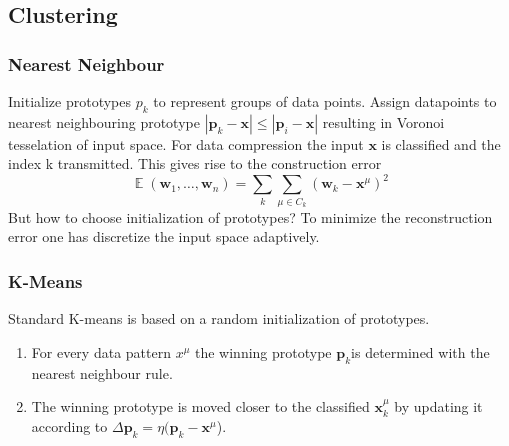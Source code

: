 \documentclass[11pt]{article}
\DeclareMathOperator{\E}{\mathbb{E}}
\newcommand\abs[1]{\left|#1\right|}
\begin{document}
\subsection{Clustering}
\subsubsection{Nearest Neighbour}
Initialize prototypes $p_k$ to represent groups of data points. Assign datapoints to nearest neighbouring prototype $\abs{\mathbf{p}_k-\mathbf{x}}\leq\abs{\mathbf{p}_i-\mathbf{x}}$ resulting in Voronoi tesselation of input space. For data compression the input $\mathbf{x}$ is classified and the index k transmitted. This gives rise to the construction error
\[
\E(\mathbf{w}_1, \dots, \mathbf{w}_n) = \sum_k \sum_{\mu \in C_k} (\mathbf{w}_k-\mathbf{x}^\mu)^2
\]
But how to choose initialization of prototypes? To minimize the reconstruction error one has discretize the input space adaptively.
\subsubsection{K-Means}
Standard K-means is based on a random initialization of prototypes. 
\begin{enumerate}
\item For every data pattern $x^\mu$ the winning prototype $\mathbf{p}_k$is determined with the nearest neighbour rule.
\item The winning prototype is moved closer to the classified $\mathbf{x}_k^\mu$ by updating it according to $\Delta \mathbf{p}_k = \eta (\mathbf{p}_k-\mathbf{x}^\mu$).
\end{enumerate}
\end{document}
